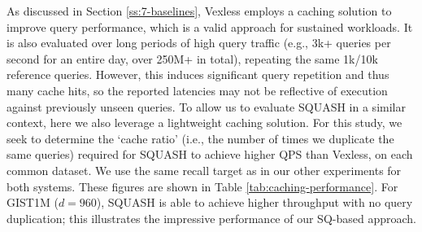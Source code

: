 As discussed in Section \ref{ss:7-baselines}, Vexless \cite{Su2024Vexless} employs a caching solution to improve query performance, which is a valid approach for sustained workloads. 
It is also evaluated over long periods of high query traffic (e.g., 3k+ queries per second for an entire day, over 250M+ in total), repeating the same 1k/10k reference queries. %
However, this induces significant query repetition and thus many cache hits, so the reported latencies may not be reflective of execution against previously unseen queries.
To allow us to evaluate SQUASH in a similar context, here we also leverage a lightweight caching solution. 
For this study, we seek to determine the `cache ratio' (i.e., the number of times we duplicate the same queries) required for SQUASH to achieve higher QPS than Vexless, on each common dataset. We use the same recall target as in our other experiments for both systems. These figures are shown in Table \ref{tab:caching-performance}. For GIST1M ($d = 960$), SQUASH is able to achieve higher throughput with no query duplication; this illustrates the impressive performance of our SQ-based approach.%